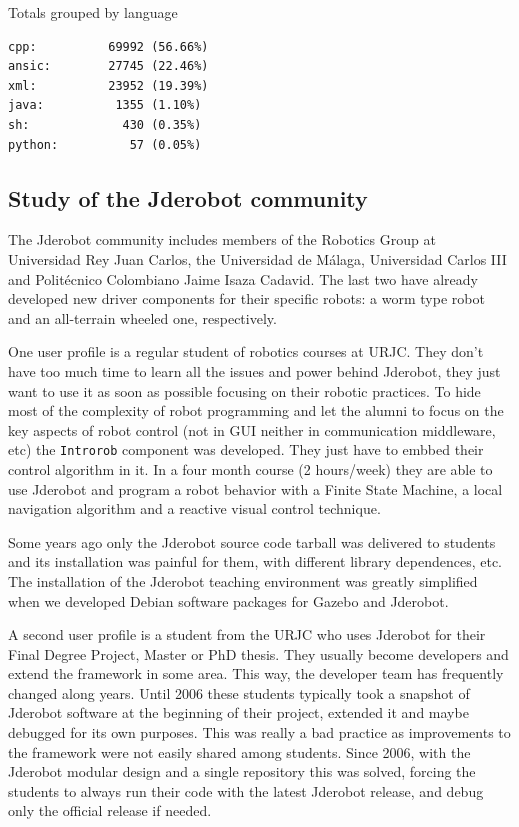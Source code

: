 \documentclass[twocolumn]{svjour3}          %
\begin{document}
Totals grouped by language
\begin{verbatim}
cpp:          69992 (56.66%)
ansic:        27745 (22.46%)
xml:          23952 (19.39%)
java:          1355 (1.10%)
sh:             430 (0.35%)
python:          57 (0.05%)
\end{verbatim}

\subsection{Study of the Jderobot community}
The Jderobot community includes members of the Robotics Group at Universidad Rey Juan Carlos, the Universidad de Málaga, Universidad Carlos III and Politécnico Colombiano Jaime Isaza Cadavid. The last two have already developed new driver components for their specific robots: a worm type robot and an all-terrain wheeled one, respectively.

One user profile is a regular student of robotics courses at URJC. They don't have too much time to learn all the issues and power behind Jderobot, they just want to use it as soon as possible focusing on their robotic practices. To hide most of the complexity of robot programming and let the alumni to focus on the key aspects of robot control (not in GUI neither in communication middleware, etc) the \texttt{Introrob} component was developed. They just have to embbed their control algorithm in it. In a four month course (2 hours/week) they are able to use Jderobot and program a robot behavior with a Finite State Machine, a local navigation algorithm and a reactive visual control technique. 

Some years ago only the Jderobot source code tarball was delivered to students and its installation was painful for them, with different library dependences, etc. The installation of the Jderobot teaching environment was greatly simplified when we developed Debian software packages for Gazebo and Jderobot.

A second user profile is a student from the URJC who uses Jderobot for their Final Degree Project, Master or PhD thesis. They usually become developers and extend the framework in some area. This way, the developer team has frequently changed along years. Until 2006 these students typically took a snapshot of Jderobot software at the beginning of their project, extended it and maybe debugged for its own purposes. This was really a bad practice as improvements to the framework were not easily shared among students. Since 2006, with the Jderobot modular design and a single repository this was solved, forcing the students to always run their code with the latest Jderobot release, and debug only the official release if needed.
\end{document}
